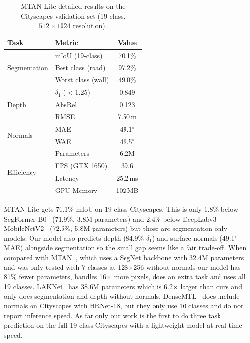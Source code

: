 \documentclass[journal, onecolumn]{IEEEtran}
\begin{document}
\begin{table}[!htbp]
\centering
\caption{MTAN-Lite detailed results on the Cityscapes validation set (19-class, $512\times1024$ resolution).}
\label{tab:cityscapes_results}
\renewcommand{\arraystretch}{1.2}
\begin{tabular}{llc}
\hline
\textbf{Task} & \textbf{Metric} & \textbf{Value} \\
\hline
\multirow{3}{*}{Segmentation} & mIoU (19-class) & 70.1\% \\
 & Best class (road) & 97.2\% \\
 & Worst class (wall) & 49.0\% \\
\hline
\multirow{3}{*}{Depth} & $\delta_1$ ($<$1.25) & 0.849 \\
 & AbsRel & 0.123 \\
 & RMSE & 7.50\,m \\
\hline
\multirow{2}{*}{Normals} & MAE & 49.1$^\circ$ \\
 & WAE & 48.5$^\circ$ \\
\hline
\multirow{4}{*}{Efficiency} & Parameters & 6.2M \\
 & FPS (GTX 1650) & 39.6 \\
 & Latency & 25.2\,ms \\
 & GPU Memory & 102\,MB \\
\hline
\end{tabular}
\end{table}

MTAN-Lite gets 70.1\% mIoU on 19 class Cityscapes. This is only 1.8\% below SegFormer-B0~\cite{xie2021segformer} (71.9\%, 3.8M parameters) and 2.4\% below DeepLabv3+ MobileNetV2~\cite{chen2018deeplabv3plus} (72.5\%, 5.8M parameters) but those are segmentation only models. Our model also predicts depth (84.9\% $\delta_1$) and surface normals (49.1$^\circ$ MAE) alongside segmentation so the small gap seems like a fair trade-off. When compared with MTAN~\cite{liu2019mtan}, which uses a SegNet backbone with 32.4M parameters and was only tested with 7 classes at 128$\times$256 without normals our model has 81\% fewer parameters, handles 16$\times$ more pixels, does an extra task and uses all 19 classes. LAKNet~\cite{laknet2025} has 38.6M parameters which is 6.2$\times$ larger than ours and only does segmentation and depth without normals. DenseMTL~\cite{lopes2023densemtl} does include normals on Cityscapes with HRNet-18, but they only use 16 classes and do not report inference speed. As far only our work is the first to do three task prediction on the full 19-class Cityscapes with a lightweight model at real time speed.
\end{document}
